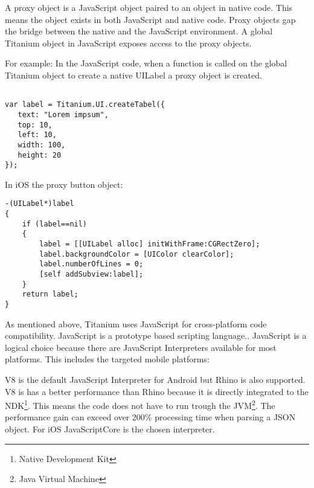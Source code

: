 A proxy object is a JavaScript object paired to an object in native code.\cite{Whinnery2012} This means the object exists in both JavaScript and native code. Proxy objects gap the bridge between the native and the JavaScript environment. A global Titanium object in JavaScript exposes access to the proxy objects. 

For example: In the JavaScript code, when a function is called on the global Titanium object to create a native UILabel a proxy object is created.

\begin{verbatim}

var label = Titanium.UI.createTabel({
   text: "Lorem impsum",
   top: 10,
   left: 10,
   width: 100,
   height: 20
});
\end{verbatim}


In iOS the proxy button object:

\begin{verbatim}
-(UILabel*)label
{
    if (label==nil)
    {
        label = [[UILabel alloc] initWithFrame:CGRectZero];
        label.backgroundColor = [UIColor clearColor];
        label.numberOfLines = 0;
        [self addSubview:label];
    }
    return label;
}
\end{verbatim}



As mentioned above, Titanium uses JavaScript for cross-platform code compatibility. JavaScript is a prototype based scripting language.\cite{Crockford2008}. JavaScript is a logical choice because there are JavaScript Interpreters available for most platforms. This includes the targeted mobile platforms:

V8 is the default JavaScript Interpreter for Android but Rhino is also supported. V8 is has a better performance than Rhino because it is directly integrated to the NDK\footnote{Native Development Kit}. This means the code does not have to run trough the JVM\footnote{Java Virtual Machine}. The performance gain can exceed over 200\% processing time when parsing a JSON object.\cite{Lukasavage2011}
For iOS JavaScriptCore is the chosen interpreter.

